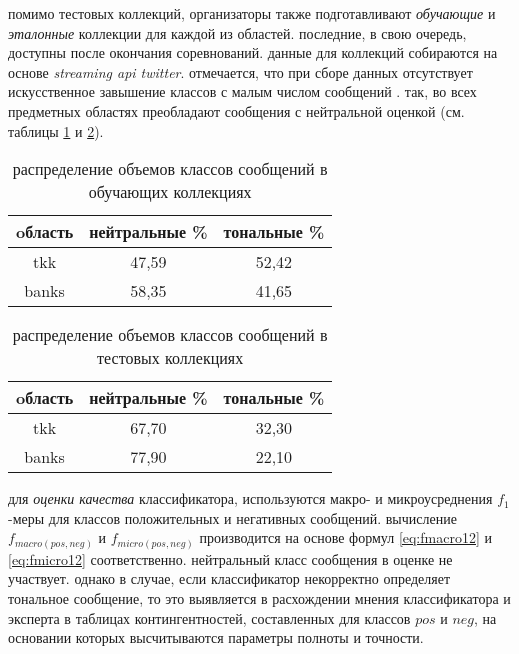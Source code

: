 
    помимо тестовых коллекций, организаторы также подготавливают {\it обучающие} и
    {\it эталонные} коллекции для каждой из областей. последние, в свою очередь,
    доступны после окончания соревнований. данные для коллекций собираются на
    основе {\it streaming api twitter}. отмечается, что при сборе данных отсутствует
    искусственное завышение классов с малым числом сообщений \cite{tonalityanalisys}.
    так, во всех предметных областях преобладают сообщения с нейтральной оценкой (см. таблицы
    \ref{table:traintablestat} и \ref{table:testtablestat}).

    \begin{table}[h]
        \centering
        \caption{распределение объемов классов сообщений в обучающих коллекциях}
        \label{table:traintablestat}
        \begin{tabular}{|c|c|c|}
            \hline
            oбласть     & нейтральные \%    & тональные  \%     \\ \hline
             tkk        & 47,59             & 52,42             \\ \hline
             banks      & 58,35             & 41,65             \\ \hline
        \end{tabular}
     \end{table}

    \begin{table}[h]
        \centering
        \caption{распределение объемов классов сообщений в тестовых коллекциях}
        \label{table:testtablestat}
        \begin{tabular}{|c|c|c|}
            \hline
            oбласть     & нейтральные \%    & тональные  \%     \\ \hline
             tkk        & 67,70             & 32,30             \\ \hline
             banks      & 77,90             & 22,10             \\ \hline
        \end{tabular}
     \end{table}
    для {\it оценки качества} классификатора, используются макро- и микроусреднения
    $f_1$-меры для классов положительных и негативных сообщений. вычисление
    $f_{macro(pos, neg)}$ и $f_{micro(pos, neg)}$ производится на основе
    формул \ref{eq:fmacro12} и \ref{eq:fmicro12} соответственно. нейтральный
    класс сообщения в оценке не участвует. однако в случае, если классификатор
    некорректно определяет тональное сообщение, то это выявляется в расхождении
    мнения классификатора и эксперта в таблицах контингентностей, составленных для
    классов $pos$ и $neg$, на основании которых высчитываются параметры полноты
    и точности.

